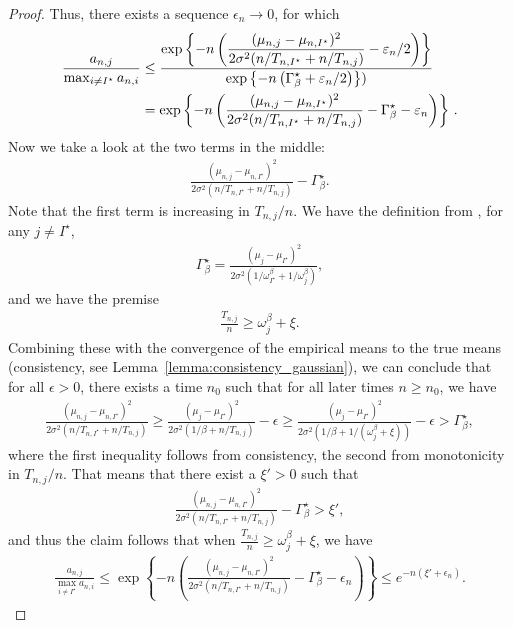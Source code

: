 \begin{proof}
	Thus, there exists a sequence $\epsilon_n \rightarrow 0$, for which 
	\begin{align*}
	    \frac{a_{n,j}}{\max_{i \neq I^\star} a_{n,i}} 
	    &\leq \frac{\displaystyle \exp\left\{-n \left( \frac{ (\mu_{n,j} - \mu_{n,I^\star})^2}{2\sigma^2 (n/T_{n,I^\star} +n/T_{n,j})} - \varepsilon_n/2 \right) \right\}}{\displaystyle \exp\left\{-n \left( \Gamma_{\beta}^\star + \varepsilon_n/2 \right)\right\})}\\
	    &= \exp\left\{-n \left(\frac{(\mu_{n,j} - \mu_{n,I^\star})^2}{2\sigma^2 (n/T_{n,I^\star} +n/T_{n,j})} - \Gamma_{\beta}^\star  - \varepsilon_n \right)\right\}\,.
	\end{align*}
	Now we take a look at the two terms in the middle:
	\begin{align*}
	\frac{(\mu_{n,j} - \mu_{n,I^\star})^2}{2\sigma^2 (n/T_{n,I^\star} +n/T_{n,j})} - \Gamma_{\beta}^\star.
	\end{align*}
	Note that the first term is increasing in $T_{n,j} / n$. We have the definition from \cite{qin2017ttei}, for any $j \neq I^\star$,
	\begin{align*}
	\Gamma_{\beta}^\star = \frac{(\mu_{j} - \mu_{I^\star})^2}{2\sigma^2 \left(1/ \omega_{I^\star}^\beta +1/\omega_j^\beta\right)}, 
	\end{align*}
	and we have the premise
	\begin{align*}
	\frac{T_{n,j}}{n} \geq \omega_j^\beta + \xi.
	\end{align*}
	Combining these with the convergence of the empirical means to the true means (consistency, see Lemma~\ref{lemma:consistency_gaussian}), we can conclude that for all $\epsilon > 0$, there exists a time $n_0$ such that for all later times $n \geq n_0$, we have
	\begin{align*}
	\frac{(\mu_{n,j} - \mu_{n,I^\star})^2}{2\sigma^2 (n/T_{n,I^\star} +n/T_{n,j})} \geq   \frac{(\mu_{j} - \mu_{I^\star})^2}{2\sigma^2 \left(1/\beta +n/T_{n,j} \right)} - \epsilon 
	\geq  \frac{(\mu_{j} - \mu_{I^\star})^2}{2\sigma^2 \left(1/\beta +1/(\omega_j^\beta + \xi)\right)} - \epsilon
	> \Gamma_{\beta}^\star,
	\end{align*}
	where the first inequality follows from consistency, the second from monotonicity in $T_{n,j} / n$. That means that there exist a $\xi' > 0$ such that
	\begin{align*}
	\frac{(\mu_{n,j} - \mu_{n,I^\star})^2}{2\sigma^2 (n/T_{n,I^\star} +n/T_{n,j})} - \Gamma_{\beta}^\star > \xi',
	\end{align*}
	and thus the claim follows that when $\frac{T_{n,j}}{n} \geq \omega_j^\beta + \xi$, we have
	\begin{align*}
	\frac{a_{n,j}}{\max_{i \neq I^\star} a_{n,i}} \leq \exp \left\lbrace - n \left(\frac{(\mu_{n,j} - \mu_{n,I^\star})^2}{2\sigma^2 (n/T_{n,I^\star} +n/T_{n,j})} - \Gamma_{\beta}^\star  - \epsilon_n \right) \right\rbrace 
	\leq e^{-n (\xi' + \epsilon_n)}.
	\end{align*}
\end{proof}


